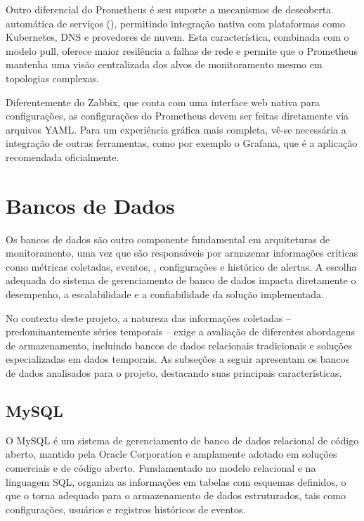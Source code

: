 Outro diferencial do Prometheus é seu suporte a mecanismos de descoberta automática de serviços (), permitindo integração nativa com plataformas como Kubernetes, DNS e provedores de nuvem. Esta característica, combinada com o modelo pull, oferece maior resilência a falhas de rede e permite que o Prometheus mantenha uma visão centralizada dos alvos de monitoramento mesmo em topologias complexas.

Diferentemente do Zabbix, que conta com uma interface web nativa para configurações, as configurações do Prometheus devem ser feitas diretamente via arquivos YAML. Para um experiência gráfica mais completa, vê-se necessária a integração de outras ferramentas, como por exemplo o Grafana, que é a aplicação recomendada oficialmente.

\section{Bancos de Dados}
\label{section:BancosDados}

Os bancos de dados são outro componente fundamental em arquiteturas de monitoramento, uma vez que são responsáveis por armazenar informações críticas como métricas coletadas, eventos, , configurações e histórico de alertas. A escolha adequada do sistema de gerenciamento de banco de dados impacta diretamente o desempenho, a escalabilidade e a confiabilidade da solução implementada.

No contexto deste projeto, a natureza das informações coletadas -- predominantemente séries temporais -- exige a avaliação de diferentes abordagens de armazenamento, incluindo bancos de dados relacionais tradicionais e soluções especializadas em dados temporais. As subseções a seguir apresentam os bancos de dados analisados para o projeto, destacando suas principais características.

\subsection{MySQL}
\label{subsection:MySQL}

O MySQL \citep{mysql2025} é um sistema de gerenciamento de banco de dados relacional de código aberto, mantido pela Oracle Corporation e amplamente adotado em soluções comerciais e de código aberto. Fundamentado no modelo relacional e na linguagem SQL, organiza as informações em tabelas com esquemas definidos, o que o torna adequado para o armazenamento de dados estruturados, tais como configurações, usuários e registros históricos de eventos.

